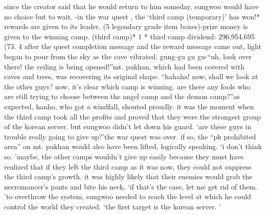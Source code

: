 since the creator said that he would return to him someday, sungwoo would have no choice but to wait.
-in the war quest , the ‘third camp (temporary)’ has won!* rewards are given to its leader.
 (5 legendary grade item boxes)-prize money is given to the winning camp.
 (third camp)* 1%
* third camp dividend: 296,954,695 (73.
4%
after the quest completion message and the reward message came out, light began to pour from the sky as the cave vibrated.
gung-gu gu gu-“uh, look over there! the ceiling is being opened!”mt.
 pukhan, which had been covered with caves and trees, was recovering its original shape.
“hahaha! now, shall we look at the other guys? now, it’s clear which camp is winning.
 are there any fools who are still trying to choose between the angel camp and the demon camp?”as expected, hanho, who got a windfall, shouted proudly.
it was the moment when the third camp took all the profits and proved that they were the strongest group of the korean server.
but sungwoo didn’t let down his guard.
‘are these guys in trouble really going to give up?’the war quest was over.
 if so, the “pk prohibited area” on mt.
 pukhan would also have been lifted, logically speaking.
‘i don’t think so.
’maybe, the other camps wouldn’t give up easily because they must have realized that if they left the third camp as it was now, they could not suppress the third camp’s growth.
it was highly likely that their enemies would grab the necromancer’s pants and bite his neck.
‘if that’s the case, let me get rid of them.
’to overthrow the system, sungwoo needed to reach the level at which he could control the world they created.
‘the first target is the korean server.
’

 
